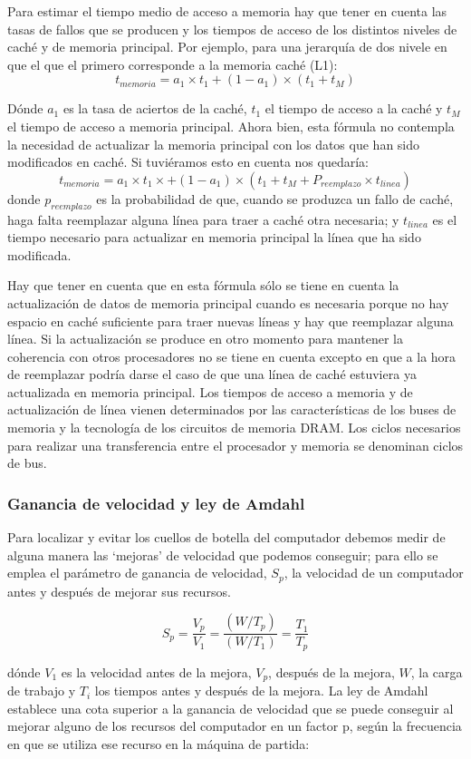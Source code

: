 \documentclass[a4paper, 11pt]{article}
\begin{document}
Para estimar el tiempo medio de acceso a memoria hay que tener en cuenta las tasas de fallos que se producen y los tiempos de acceso de los distintos niveles de caché y de memoria principal. Por ejemplo, para una jerarquía de dos nivele en que el que el primero corresponde a la memoria caché (L1): 
$$t_{memoria}=a_1 \times t_1 + (1-a_1) \times (t_1 + t_M)$$ 

Dónde $a_1$ es la tasa de aciertos de la caché, $t_1$ el tiempo de acceso a la caché y $t_M$ el tiempo de acceso a memoria principal. Ahora bien, esta fórmula no contempla la necesidad de actualizar la memoria principal con los datos que han sido modificados en caché. Si tuviéramos esto en cuenta nos quedaría:
$$t_{memoria} = a_1 \times t_1 \times + (1-a_1) \times (t_1+t_M+P_{reemplazo} \times t_{linea})$$ donde $p_{reemplazo}$ es la probabilidad de que, cuando se produzca un fallo de caché, haga falta reemplazar alguna línea para traer a caché otra necesaria; y $t_{linea}$ es el tiempo necesario para actualizar en memoria principal la línea que ha sido modificada.

Hay que tener en cuenta que en esta fórmula sólo se tiene en cuenta la actualización de datos de memoria principal cuando es necesaria porque no hay espacio en caché suficiente para traer nuevas líneas y hay que reemplazar alguna línea. Si la actualización se produce en otro momento para mantener la coherencia con otros procesadores no se tiene en cuenta excepto en que a la hora de reemplazar podría darse el caso de que una línea de caché estuviera ya actualizada en memoria principal. 
Los tiempos de acceso a memoria y de actualización de línea vienen determinados por las características de los buses de memoria y la tecnología de los circuitos de memoria DRAM. Los ciclos necesarios para realizar una transferencia entre el procesador y memoria se denominan ciclos de bus.

\subsubsection{Ganancia de velocidad y ley de Amdahl}
Para localizar y evitar los cuellos de botella del computador debemos medir de alguna manera las `mejoras' de velocidad que podemos conseguir; para ello se emplea el parámetro de ganancia de velocidad, $S_p$, la velocidad de un computador antes y después de mejorar sus recursos.

$$S_p=\frac{V_p}{V_1}=\frac{(W/T_p)}{(W/T_1)} =\frac{T_1}{T_p} $$


dónde $V_1$ es la velocidad antes de la mejora, $V_p$, después de la mejora, $W$, la carga de trabajo y $T_i$ los tiempos antes y después de la mejora.
La ley de Amdahl establece una cota superior a la ganancia de velocidad que se puede conseguir al mejorar alguno de los recursos del computador en un factor p, según la frecuencia en que se utiliza ese recurso en la máquina de partida:
\end{document}
